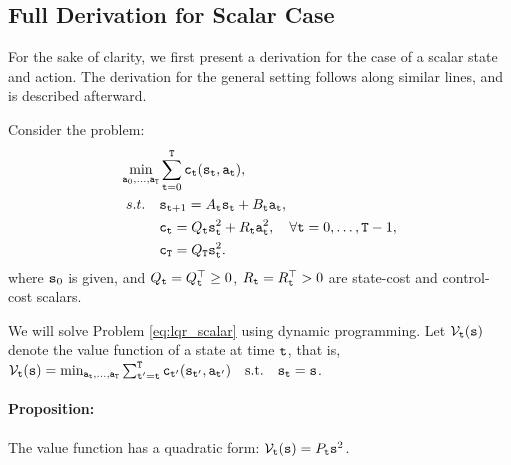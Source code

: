 \begin{leftbar}
\subsection*{Full Derivation for Scalar Case}
For the sake of clarity, we first present a derivation for the case of a scalar state and action. The derivation for the general setting follows along similar lines, and is described afterward.

Consider the problem:
\begin{equation}\label{eq:lqr_scalar}
    \begin{split}
        \min_{{\tt a}_0,\dots,{\tt a}_{{\tt T}}} & \sum_{{\tt t}=0}^{\tt T} {\tt c}_{\tt t}({\tt s}_{\tt t}, {\tt a}_{\tt t}), \\
        s.t. \quad & {{\tt s}_{{\tt t}+1}} = A_{\tt t} {\tt s}_{\tt t} + B_{\tt t} {\tt a}_{\tt t}, \\
        & {\tt c}_{\tt t} = Q_{\tt t} {\tt s}_{\tt t}^2 + R_{\tt t} {\tt a}_{\tt t}^2, \quad \forall {\tt t}=0,\dots,{\tt T}-1, \\
        & {\tt c}_{\tt T} = Q_{\tt T} {\tt s}_{\tt t}^2.
    \end{split}
\end{equation}
where ${\tt s}_0$ is given, and $Q_{\tt t}=Q_{\tt t}^\top \geq 0$, $R_{\tt t} = R_{\tt t}^\top > 0 $ are state-cost and control-cost scalars.

We will solve Problem \ref{eq:lqr_scalar} using dynamic programming. Let $\mathcal{V}_{\tt t}({\tt s})$ denote the value function of a state at time ${\tt t}$, that is, $\mathcal{V}_{\tt t}({\tt s}) = \min_{{\tt a}_{\tt t},\dots,{\tt a}_{\tt T}} \sum_{{\tt t}'={\tt t}}^{\tt T} {\tt c}_{{\tt t}'}({\tt s}_{{\tt t}'}, {\tt a}_{{\tt t}'}) \quad \textrm{s.t.} \quad {\tt s}_{\tt t} = {\tt s}$. 

\paragraph{Proposition:}
The value function has a quadratic form: $\mathcal{V}_{\tt t}({\tt s}) = P_{\tt t} {\tt s}^2$. 


\end{leftbar}
